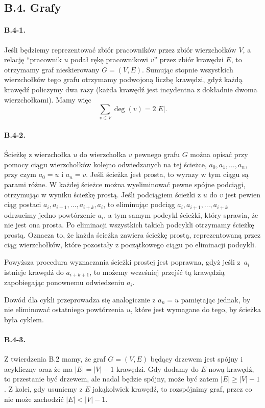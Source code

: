 \subsection*{B.4. Grafy}

\paragraph{B.4-1.}
Jeśli będziemy reprezentować zbiór pracowników przez zbiór wierzchołków $V$, a relację ``pracownik $u$ podał rękę pracownikowi $v$'' przez zbiór krawędzi $E$, to otrzymamy graf nieskierowany $G=(V,E)$. Sumując stopnie wszystkich wierzchołków tego grafu otrzymamy podwojoną liczbę krawędzi, gdyż każdą krawędź policzymy dwa razy (każda krawędź jest incydentna z dokładnie dwoma wierzchołkami). Mamy więc
\[
	\sum_{v\in V}\deg(v)=2|E|.
\]

\paragraph{B.4-2.}
Ścieżkę z wierzchołka $u$ do wierzchołka $v$ pewnego grafu $G$ można opisać przy pomocy ciągu wierzchołków kolejno odwiedzanych na tej ścieżce, $a_0,a_1,\dots,a_n$, przy czym $a_0=u$ i $a_n=v$. Jeśli ścieżka jest prosta, to wyrazy w tym ciągu są parami różne. W każdej ścieżce można wyeliminować pewne spójne podciągi, otrzymując w wyniku ścieżkę prostą. Jeśli podciągiem ścieżki z $u$ do $v$ jest pewien ciąg postaci $a_i,a_{i+1},\dots,a_{i+k},a_i$, to eliminując podciąg $a_i,a_{i+1},\dots,a_{i+k}$ odrzucimy jedno powtórzenie $a_i$, a tym samym podcykl ścieżki, który sprawia, że nie jest ona prosta. Po eliminacji wszystkich takich podcykli otrzymamy ścieżkę prostą. Oznacza to, że każda ścieżka zawiera ścieżkę prostą, reprezentowaną przez ciąg wierzchołków, które pozostały z początkowego ciągu po eliminacji podcykli.

Powyższa procedura wyznaczania ścieżki prostej jest poprawna, gdyż jeśli z~$a_i$ istnieje krawędź do $a_{i+k+1}$, to możemy wcześniej przejść tą krawędzią zapobiegając ponownemu odwiedzeniu $a_i$.

Dowód dla cykli przeprowadza się analogicznie z $a_n=u$ pamiętając jednak, by nie eliminować ostatniego powtórzenia $u$, które jest wymagane do tego, by ścieżka była cyklem.

\paragraph{B.4-3.}
Z twierdzenia B.2 mamy, że graf $G=(V,E)$ będący drzewem jest spójny i acykliczny oraz że ma $|E|=|V|-1$ krawędzi. Gdy dodamy do $E$ nową krawędź, to przestanie być drzewem, ale nadal będzie spójny, może być zatem $|E|\ge |V|-1$. Z kolei, gdy usuniemy z $E$ jakąkolwiek krawędź, to rozspójnimy graf, przez co nie może zachodzić $|E|<|V|-1$.

